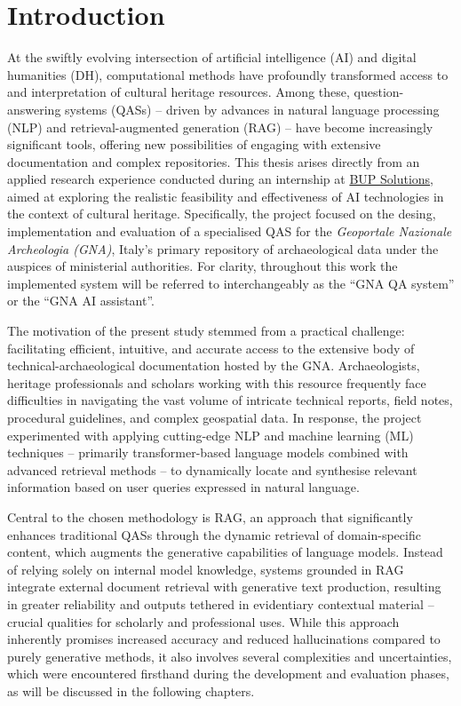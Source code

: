 \chapter{Introduction}
\label{chap:introduction}
\begin{spacing}{1.5}  %
At the swiftly evolving intersection of artificial intelligence (AI) and digital humanities (DH), computational methods have profoundly transformed access to and interpretation of cultural heritage resources. Among these, question-answering systems (QASs) -- driven by advances in natural language processing (NLP) and retrieval-augmented generation (RAG) -- have become increasingly significant tools, offering new possibilities of engaging with extensive documentation and complex repositories. This thesis arises directly from an applied research experience conducted during an internship at \href{https://www.bupsolutions.com/en/home_en/}{BUP Solutions}\nocite{bup_solutions_bup_nodate}, aimed at exploring the realistic feasibility and effectiveness of AI technologies in the context of cultural heritage. Specifically, the project focused on the desing, implementation and evaluation of a specialised QAS for the \textit{Geoportale Nazionale Archeologia (GNA)}, Italy’s primary repository of archaeological data under the auspices of ministerial authorities. For clarity, throughout this work the implemented system will be referred to interchangeably as the ``GNA QA system'' or the ``GNA AI assistant''.

The motivation of the present study stemmed from a practical challenge: facilitating efficient, intuitive, and accurate access to the extensive body of technical-archaeological documentation hosted by the GNA. Archaeologists, heritage professionals and scholars working with this resource frequently face difficulties in navigating the vast volume of intricate technical reports, field notes, procedural guidelines, and complex geospatial data. In response, the project experimented with applying cutting-edge NLP and machine learning (ML) techniques -- primarily transformer-based language models combined with advanced retrieval methods -- to dynamically locate and synthesise relevant information based on user queries expressed in natural language.

Central to the chosen methodology is RAG, an approach that significantly enhances traditional QASs through the dynamic retrieval of domain-specific content, which augments the generative capabilities of language models. Instead of relying solely on internal model knowledge, systems grounded in RAG integrate external document retrieval with generative text production, resulting in greater reliability and outputs tethered in evidentiary contextual material -- crucial qualities for scholarly and professional uses. While this approach inherently promises increased accuracy and reduced hallucinations compared to purely generative methods, it also involves several complexities and uncertainties, which were encountered firsthand during the development and evaluation phases, as will be discussed in the following chapters.


\end{spacing}

